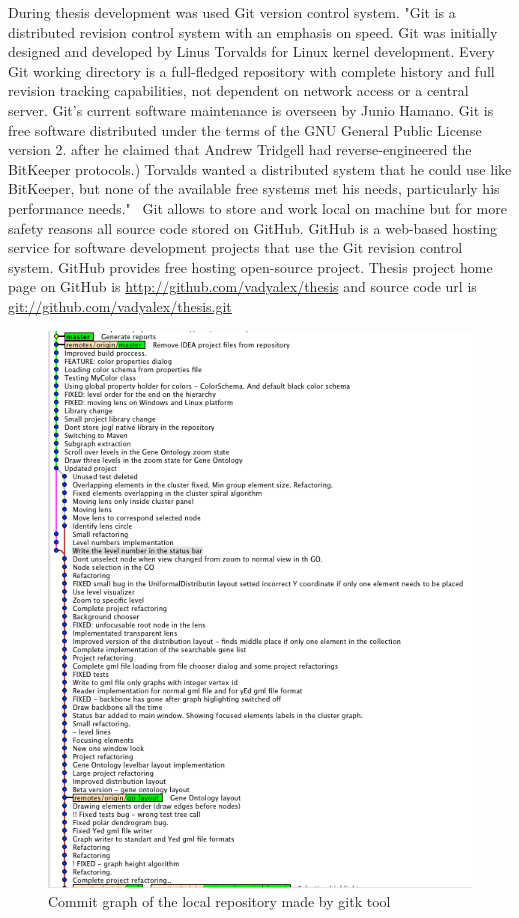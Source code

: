\documentclass[a4paper,oneside]{article}
\begin{document}
During thesis development was used Git version control system. "Git is a distributed revision control system with an emphasis on speed. Git was initially designed and developed by Linus Torvalds for Linux kernel development. Every Git working directory is a full-fledged repository with complete history and full revision tracking capabilities, not dependent on network access or a central server. Git's current software maintenance is overseen by Junio Hamano. Git is free software distributed under the terms of the GNU General Public License version 2. after he claimed that Andrew Tridgell had reverse-engineered the BitKeeper protocols.)
Torvalds wanted a distributed system that he could use like BitKeeper, but none of the available free systems met his needs, particularly his performance needs."~\cite{GIT} Git allows to store and work local on machine but for more safety reasons all source code stored on GitHub. GitHub is a web-based hosting service for software development projects that use the Git revision control system. GitHub provides free hosting open-source project. Thesis project home page on GitHub is \url{http://github.com/vadyalex/thesis} and source code url is \url{git://github.com/vadyalex/thesis.git} 

\begin{figure}
\begin{center}
	\includegraphics[scale=0.6]{pictures/commit_graph_gitk.png}
	\caption{Commit graph of the local repository made by gitk tool}
\end{center}
\end{figure}
\end{document}
